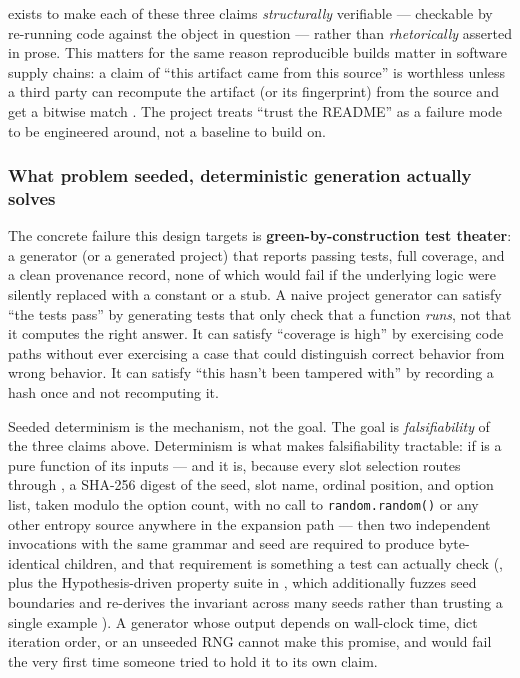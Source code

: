 \documentclass[
]{article}
\newcounter{none} %
\begin{document}
 exists to make each of these three claims
\emph{structurally} verifiable --- checkable by re-running code against
the object in question --- rather than \emph{rhetorically} asserted in
prose. This matters for the same reason reproducible builds matter in
software supply chains: a claim of ``this artifact came from this
source'' is worthless unless a third party can recompute the artifact
(or its fingerprint) from the source and get a bitwise match
\citep{reproducible_builds}. The project treats ``trust the README'' as
a failure mode to be engineered around, not a baseline to build on.

\subsubsection{What problem seeded, deterministic generation actually
solves}\label{what-problem-seeded-deterministic-generation-actually-solves}

The concrete failure this design targets is
\textbf{green-by-construction test theater}: a generator (or a generated
project) that reports passing tests, full coverage, and a clean
provenance record, none of which would fail if the underlying logic were
silently replaced with a constant or a stub. A naive project generator
can satisfy ``the tests pass'' by generating tests that only check that
a function \emph{runs}, not that it computes the right answer. It can
satisfy ``coverage is high'' by exercising code paths without ever
exercising a case that could distinguish correct behavior from wrong
behavior. It can satisfy ``this hasn't been tampered with'' by recording
a hash once and not recomputing it.

Seeded determinism is the mechanism, not the goal. The goal is
\emph{falsifiability} of the three claims above. Determinism is what
makes falsifiability tractable: if  is a
pure function of its inputs --- and it is, because every slot selection
routes through
, a
SHA-256 digest of the seed, slot name, ordinal position, and option
list, taken modulo the option count, with no call to
\texttt{random.random()} or any other entropy source anywhere in the
expansion path --- then two independent invocations with the same
grammar and seed are required to produce byte-identical children, and
that requirement is something a test can actually check
(, plus the
Hypothesis-driven property suite in
, which additionally fuzzes seed
boundaries and re-derives the invariant across many seeds rather than
trusting a single example
\citep{claessen2000quickcheck, maciver2019hypothesis}). A generator
whose output depends on wall-clock time, dict iteration order, or an
unseeded RNG cannot make this promise, and would fail the very first
time someone tried to hold it to its own claim.
\end{document}
